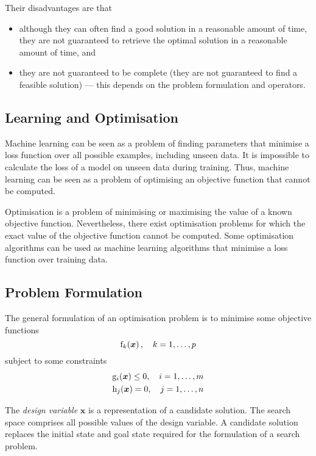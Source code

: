 Their disadvantages are that
\begin{itemize}
  \item although they can often find a good solution in a reasonable amount of time, they are not guaranteed to retrieve the optimal solution in a reasonable amount of time, and
  \item they are not guaranteed to be complete (they are not guaranteed to find a feasible solution) --- this depends on the problem formulation and operators.
\end{itemize}

\subsection{Learning and Optimisation}

Machine learning can be seen as a problem of finding parameters that minimise a loss function over all possible examples, including unseen data.
It is impossible to calculate the loss of a model on unseen data during training.
Thus, machine learning can be seen as a problem of optimising an objective function that cannot be computed.

Optimisation is a problem of minimising or maximising the value of a known objective function.
Nevertheless, there exist optimisation problems for which the exact value of the objective function cannot be computed.
Some optimisation algorithms can be used as machine learning algorithms that minimise a loss function over training data.

\subsection{Problem Formulation}

The general formulation of an optimisation problem is to minimise some objective functions
\begin{equation*}
  \function[_{k}]{f}{\boldsymbol{x}}, \quad k = 1, \ldots, p
\end{equation*}
subject to some constraints
\begin{gather*}
  \function[_{i}]{g}{\boldsymbol{x}} \leq 0, \quad i = 1, \ldots, m \\
  \function[_{j}]{h}{\boldsymbol{x}} = 0, \quad j = 1, \ldots, n
\end{gather*}

The \emph{design variable} \( \boldsymbol{x} \) is a representation of a candidate solution.
The search space comprises all possible values of the design variable.
A candidate solution replaces the initial state and goal state required for the formulation of a search problem.

